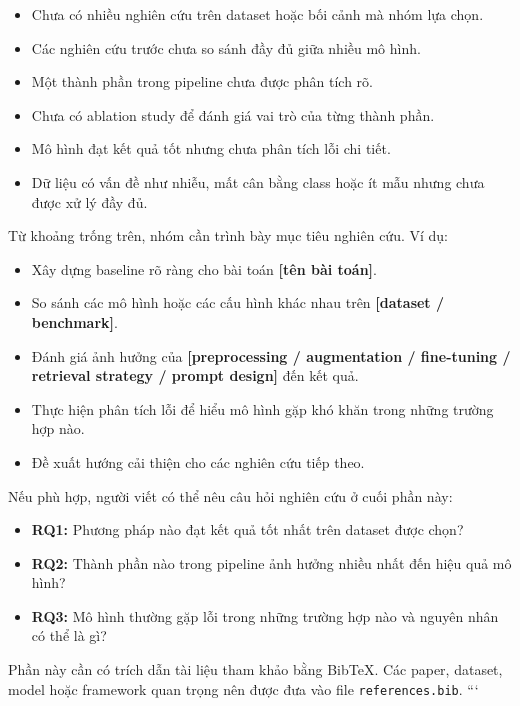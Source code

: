 \documentclass[12pt]{ai_conquer2026}
\begin{document}
\begin{itemize}
    \item Chưa có nhiều nghiên cứu trên dataset hoặc bối cảnh mà nhóm lựa chọn.
    \item Các nghiên cứu trước chưa so sánh đầy đủ giữa nhiều mô hình.
    \item Một thành phần trong pipeline chưa được phân tích rõ.
    \item Chưa có ablation study để đánh giá vai trò của từng thành phần.
    \item Mô hình đạt kết quả tốt nhưng chưa phân tích lỗi chi tiết.
    \item Dữ liệu có vấn đề như nhiễu, mất cân bằng class hoặc ít mẫu nhưng chưa được xử lý đầy đủ.
\end{itemize}

Từ khoảng trống trên, nhóm cần trình bày mục tiêu nghiên cứu. Ví dụ:

\begin{itemize}
    \item Xây dựng baseline rõ ràng cho bài toán \textbf{[tên bài toán]}.
    \item So sánh các mô hình hoặc các cấu hình khác nhau trên \textbf{[dataset / benchmark]}.
    \item Đánh giá ảnh hưởng của \textbf{[preprocessing / augmentation / fine-tuning / retrieval strategy / prompt design]} đến kết quả.
    \item Thực hiện phân tích lỗi để hiểu mô hình gặp khó khăn trong những trường hợp nào.
    \item Đề xuất hướng cải thiện cho các nghiên cứu tiếp theo.
\end{itemize}

Nếu phù hợp, người viết có thể nêu câu hỏi nghiên cứu ở cuối phần này:

\begin{itemize}
    \item \textbf{RQ1:} Phương pháp nào đạt kết quả tốt nhất trên dataset được chọn?
    \item \textbf{RQ2:} Thành phần nào trong pipeline ảnh hưởng nhiều nhất đến hiệu quả mô hình?
    \item \textbf{RQ3:} Mô hình thường gặp lỗi trong những trường hợp nào và nguyên nhân có thể là gì?
\end{itemize}

Phần này cần có trích dẫn tài liệu tham khảo bằng BibTeX. Các paper, dataset, model hoặc framework quan trọng nên được đưa vào file \texttt{references.bib}.
```
\end{document}
